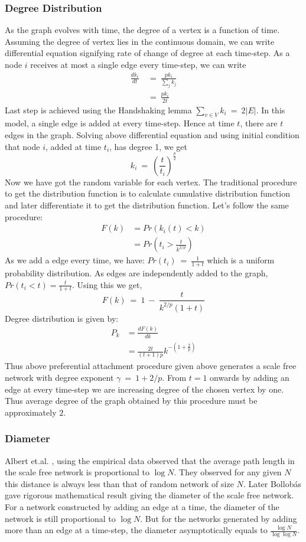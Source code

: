 \documentclass[12pt]{article}
\begin{document}
\subsubsection{Degree Distribution}
As the graph evolves with time, the degree of a vertex is a function of time. Assuming the degree of vertex lies in the continuous domain, we can write differential equation signifying rate of change of degree at each time-step. As a node $i$ receives at most a single edge every time-step, we can write
\begin{align*}
\frac {dk_i} {dt} &~=~ \frac {p k_i} {\sum_{j} {k_j}} \\
	&~=~ \frac {p k_i} {2t}
\end{align*}
Last step is achieved using the Handshaking lemma $\sum_{v \in V}{k_i} ~=~ 2|E|$. In this model, a single edge is added at every time-step. Hence at time $t$, there are $t$ edges in the graph. Solving above differential equation and using initial condition that node $i$, added at time $t_i$, has degree 1, we get
\[
k_i ~=~ \left(\frac {t} {t_i}\right)^{\frac {p} {2}}
\]
Now we have got the random variable for each vertex. The traditional procedure to get the distribution function is to calculate cumulative distribution function and later differentiate it to get the distribution function. Let's follow the same procedure:
\begin{align*}
F(k) &= Pr(k_i(t) < k) \\
	 &= Pr(t_i > \frac {t} {k^{2/p}})
\end{align*}
As we add a edge every time, we have: $Pr(t_i) ~=~ \frac {1} {1 + t}$ which is a uniform probability distribution. As edges are independently added to the graph, $Pr(t_i < t) = \frac {t} {1 + t}$. Using this we get,
\[
F(k) ~=~ 1 ~-~ \frac {t} {k^{2/p}(1 + t)}
\]
Degree distribution is given by:
\begin{align}
P_k &=\frac {dF(k)} {dk} \nonumber \\
	&=\frac {2t} {(t + 1)p} k^{-(1 + \frac{2}{p})}
\end{align}
Thus above preferential attachment procedure given above generates a scale free network with degree exponent $\gamma ~=~ 1 + 2/p$. From $t = 1$ onwards by adding an edge at every time-step we are increasing degree of the chosen vertex by one. Thus average degree of the graph obtained by this procedure must be approximately $2$.

\subsubsection{Diameter}
Albert et.al. \cite{statistical}, using the empirical data observed that the average path length in the scale free network is proportional to $\log N$. They observed for any given $N$ this distance is always less than that of random network of size $N$. Later Bollob\'as\cite{bollobas} gave rigorous mathematical result giving the diameter of the scale free network. For a network constructed by adding an edge at a time, the diameter of the network is still proportional to $\log N$. But for the networks generated by adding more than an edge at a time-step, the diameter asymptotically equals to $\frac {\log N} {\log \log N}$.
\end{document}
